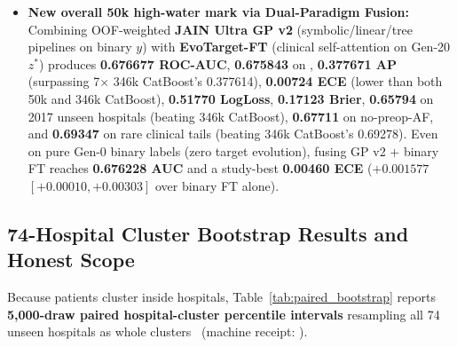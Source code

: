 \begin{itemize}
  \item \textbf{New overall 50k high-water mark via Dual-Paradigm Fusion:} Combining OOF-weighted \textbf{JAIN Ultra GP v2} (symbolic/linear/tree pipelines on binary $y$) with \textbf{EvoTarget-FT} (clinical self-attention on Gen-20 $z^*$) produces \textbf{0.676677 ROC-AUC}, \textbf{0.675843} on , \textbf{0.377671 AP} (surpassing 7$\times$ 346k CatBoost's 0.377614), \textbf{0.00724 ECE} (lower than both 50k and 346k CatBoost), \textbf{0.51770 LogLoss}, \textbf{0.17123 Brier}, \textbf{0.65794} on 2017 unseen hospitals (beating 346k CatBoost), \textbf{0.67711} on no-preop-AF, and \textbf{0.69347} on rare clinical tails (beating 346k CatBoost's 0.69278). Even on pure Gen-0 binary labels (zero target evolution), fusing GP v2 $+$ binary FT reaches \textbf{0.676228 AUC} and a study-best \textbf{0.00460 ECE} ($+0.001577$ $[+0.00010, +0.00303]$ over binary FT alone).
\end{itemize}

\subsection{74-Hospital Cluster Bootstrap Results and Honest Scope}
Because patients cluster inside hospitals, Table~\ref{tab:paired_bootstrap} reports \textbf{5,000-draw paired hospital-cluster percentile intervals} resampling all 74 unseen hospitals as whole clusters~\cite{davison1997bootstrap,obuchowski1997clustered} (machine receipt: ).



